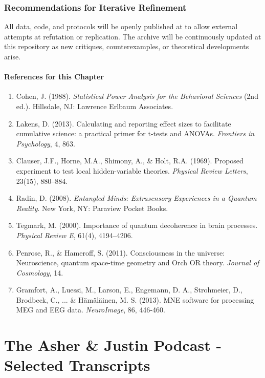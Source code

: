 \documentclass{report}
\begin{document}
\section{Recommendations for Iterative Refinement}
\label{sec:iterative_refinement_cfh_main}

All data, code, and protocols will be openly published at 
to allow external attempts at refutation or replication.
The archive will be continuously updated at this repository as new critiques, counterexamples, or theoretical developments arise.

\subsection*{References for this Chapter}
\label{subsec:references_falsification_cfh_main}
\begin{enumerate}
    \item Cohen, J. (1988). \textit{Statistical Power Analysis for the Behavioral Sciences} (2nd ed.). Hillsdale, NJ: Lawrence Erlbaum Associates.
    \item Lakens, D. (2013). Calculating and reporting effect sizes to facilitate cumulative science: a practical primer for t-tests and ANOVAs. \textit{Frontiers in Psychology}, 4, 863.
    \item Clauser, J.F., Horne, M.A., Shimony, A., \& Holt, R.A. (1969). Proposed experiment to test local hidden-variable theories. \textit{Physical Review Letters}, 23(15), 880–884.
    \item Radin, D. (2008). \textit{Entangled Minds: Extrasensory Experiences in a Quantum Reality}. New York, NY: Paraview Pocket Books.
    \item Tegmark, M. (2000). Importance of quantum decoherence in brain processes. \textit{Physical Review E}, 61(4), 4194–4206.
    \item Penrose, R., \& Hameroff, S. (2011). Consciousness in the universe: Neuroscience, quantum space-time geometry and Orch OR theory. \textit{Journal of Cosmology}, 14.
    \item Gramfort, A., Luessi, M., Larson, E., Engemann, D. A., Strohmeier, D., Brodbeck, C., ... \& Hämäläinen, M. S. (2013). MNE software for processing MEG and EEG data. \textit{NeuroImage}, 86, 446-460.
\end{enumerate}


\part{The Asher \& Justin Podcast - Selected Transcripts}
\label{part:podcast_transcripts}
\end{document}
